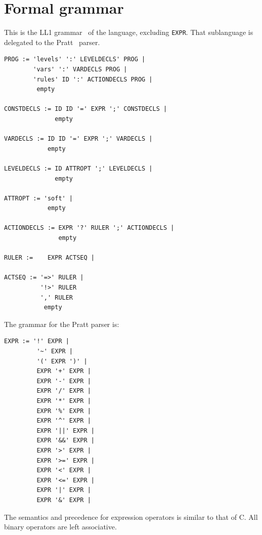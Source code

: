 \documentclass[a4paper]{article}
\begin{document}
\section{Formal grammar}
This is the LL1 grammar~\cite{aho2007compilers} of the language, excluding \texttt{EXPR}.
That sublanguage
is delegated to the Pratt~\cite{pratt} parser.
\begin{verbatim}
PROG := 'levels' ':' LEVELDECLS' PROG |
        'vars' ':' VARDECLS PROG |
        'rules' ID ':' ACTIONDECLS PROG |
         empty

CONSTDECLS := ID ID '=' EXPR ';' CONSTDECLS |
              empty

VARDECLS :=	ID ID '=' EXPR ';' VARDECLS |
            empty

LEVELDECLS := ID ATTROPT ';' LEVELDECLS |
              empty

ATTROPT := 'soft' |
            empty

ACTIONDECLS := EXPR '?' RULER ';' ACTIONDECLS |
               empty

RULER :=	EXPR ACTSEQ |

ACTSEQ := '=>' RULER |
          '!>' RULER
          ',' RULER
           empty
\end{verbatim}
The grammar for the Pratt parser is:
\begin{verbatim}
EXPR := '!' EXPR |
         '~' EXPR |
         '(' EXPR ')' |
         EXPR '+' EXPR |
         EXPR '-' EXPR |
         EXPR '/' EXPR |
         EXPR '*' EXPR |
         EXPR '%' EXPR |
         EXPR '^' EXPR |
         EXPR '||' EXPR |
         EXPR '&&' EXPR |
         EXPR '>' EXPR |
         EXPR '>=' EXPR |
         EXPR '<' EXPR |
         EXPR '<=' EXPR |
         EXPR '|' EXPR |
         EXPR '&' EXPR |
\end{verbatim}
The semantics and precedence for expression operators is similar
to that of C. All binary operators are left associative.


\end{document}
